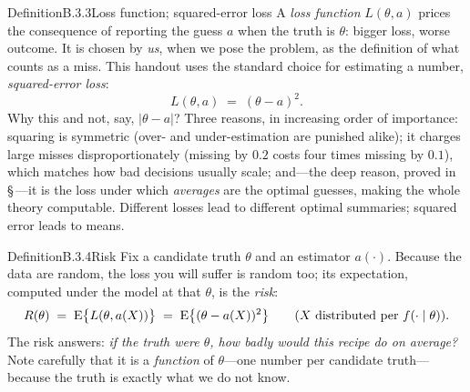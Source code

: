 \documentclass[main.tex]{subfiles}
\begin{document}
\begin{Obj}{Definition}{B.3.3}{Loss function; squared-error loss}
A \emph{loss function} $L(\theta,a)$ prices the consequence of reporting the guess $a$ when
the truth is $\theta$: bigger loss, worse outcome. It is chosen by \emph{us}, when we pose
the problem, as the definition of what counts as a miss. This handout uses the standard
choice for estimating a number, \emph{squared-error loss}:
\[ L(\theta, a) \;=\; (\theta - a)^2 . \]
Why this and not, say, $|\theta-a|$? Three reasons, in increasing order of importance:
squaring is symmetric (over- and under-estimation are punished alike); it charges large
misses disproportionately (missing by $0.2$ costs four times missing by $0.1$), which
matches how bad decisions usually scale; and---the deep reason, proved in
\S\,---it is the loss under which \emph{averages} are the optimal guesses, making
the whole theory computable. Different losses lead to different optimal summaries; squared
error leads to means.
\end{Obj}

\begin{Obj}{Definition}{B.3.4}{Risk}
Fix a candidate truth $\theta$ and an estimator $a(\cdot)$. Because the data are random, the
loss you will suffer is random too; its expectation, computed under the model at that
$\theta$, is the \emph{risk}:
\[ R(\theta) \;=\; \mathrm{E}\big\{ L(\theta, a(X)) \big\}
   \;=\; \mathrm{E}\big\{ (\theta - a(X))^2 \big\}
   \qquad\text{($X$ distributed per $f(\cdot\mid\theta)$)} . \]
The risk answers: \emph{if the truth were $\theta$, how badly would this recipe do on
average?} Note carefully that it is a \emph{function} of $\theta$---one number per candidate
truth---because the truth is exactly what we do not know.
\end{Obj}
\end{document}
